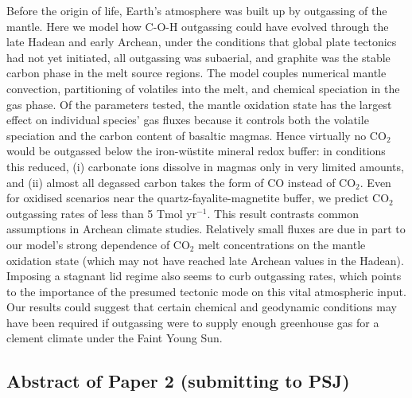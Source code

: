 \documentclass[10pt,a4paper]{article}
\begin{document}
Before the origin of life, Earth's atmosphere was built up by outgassing of the mantle. Here we model how C-O-H outgassing could have evolved through the late Hadean and early Archean, under the conditions that global plate tectonics had not yet initiated, all outgassing was subaerial, and graphite was the stable carbon phase in the melt source regions. The model couples numerical mantle convection, partitioning of volatiles into the melt, and chemical speciation in the gas phase. Of the parameters tested, the mantle oxidation state has the largest effect on individual species' gas fluxes because it controls both the volatile speciation and the carbon content of basaltic magmas. Hence virtually no CO$_2$ would be outgassed below the iron-w\"ustite mineral redox buffer: in conditions this reduced, (i) carbonate ions dissolve in magmas only in very limited amounts, and (ii) almost all degassed carbon takes the form of CO instead of CO$_2$. Even for oxidised scenarios near the quartz-fayalite-magnetite buffer, we predict CO$_2$ outgassing rates of less than 5 Tmol yr$^{-1}$. This result contrasts common assumptions in Archean climate studies. Relatively small fluxes are due in part to our model's strong dependence of CO$_2$ melt concentrations on the mantle oxidation state (which may not have reached late Archean values in the Hadean). Imposing a stagnant lid regime also seems to curb outgassing rates, which points to the importance of the presumed tectonic mode on this vital atmospheric input. Our results could suggest that certain chemical and geodynamic conditions may have been required if outgassing were to supply enough greenhouse gas for a clement climate under the Faint Young Sun.



\subsection{Abstract of Paper 2 (submitting to PSJ)}
\end{document}
